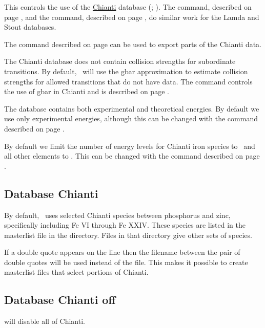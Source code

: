 This controls the use of the 
\href{http://www.chiantidatabase.org/}{Chianti} database 
(\cite{Dere.K97CHIANTI---an-atomic-database-for-emission}; \cite{Landi2012}).
The  command, described on page \pageref{sec:SetLamda},
and the  command, described on page \pageref{sec:SetStout},
do similar work for the Lamda and Stout databases.

The  command described on 
page \pageref{sec:CommandSaveChianti} can be used to export parts of 
the Chianti data.

The Chianti database does not contain collision strengths for subordinate transitions.
By default, \Cloudy\ will use the gbar approximation to estimate collision strengths for allowed transitions that do not have data. 
The  command controls the use of gbar in Chianti and is described on page \pageref{sec:Setgbar}.

The database contains both experimental and theoretical energies.  By default
we use only experimental energies, although this can be changed with the 
 command described on page \pageref{sec:AtomChiantiExperimental}.

By default we limit the number of energy levels for Chianti iron species to 
\nDefaultPhotoLevelsFe\ and all other elements to \nDefaultPhotoLevels.
This can be changed with the   command
described on page \pageref{sec:AtomChiantiLevels}.

\subsection{Database Chianti }
By default, \Cloudy\ uses selected Chianti species between phosphorus and zinc, 
specifically including Fe VI through Fe XXIV.
These species are listed in the  masterlist file in the 
 directory.
Files in that directory give other sets of species.

If a double quote appears on the line then the filename
between the pair of double quotes will be used instead of
the  file.
This makes it possible to create masterlist files that select portions
of Chianti.

\subsection{Database Chianti off} 
will disable all of Chianti.

